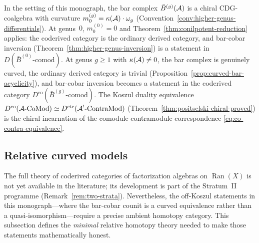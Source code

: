 \begin{remark}
\label{rem:coderived-bar-cobar}
In the setting of this monograph, the bar complex
$\bar{B}^{(g)}(\mathcal{A})$ is a chiral CDG-coalgebra with curvature
$m_0^{(g)} = \kappa(\mathcal{A}) \cdot \omega_g$
(Convention~\ref{conv:higher-genus-differentials}).
At genus~$0$, $m_0^{(0)} = 0$ and
Theorem~\ref{thm:conilpotent-reduction} applies: the coderived
category is the ordinary derived category, and bar-cobar
inversion (Theorem~\ref{thm:higher-genus-inversion})
is a statement in $D(\bar{B}^{(0)}\text{-}\mathrm{comod})$.
At genus $g \geq 1$ with $\kappa(\mathcal{A}) \neq 0$, the bar complex
is genuinely curved, the ordinary derived category is trivial
(Proposition~\ref{prop:curved-bar-acyclicity}), and bar-cobar
inversion becomes a statement in the coderived category
$D^{\mathrm{co}}(\bar{B}^{(g)}\text{-}\mathrm{comod})$.
The Koszul duality equivalence
$D^{\mathrm{co}}(\mathcal{A}\text{-}\mathrm{CoMod})
\simeq D^{\mathrm{ctr}}(\mathcal{A}^!\text{-}\mathrm{ContraMod})$
(Theorem~\ref{thm:positselski-chiral-proved}) is the chiral
incarnation of the comodule-contramodule correspondence
\eqref{eq:co-contra-equivalence}.
\end{remark}


\subsection{Relative curved models}
\label{sec:coderived-models}

The full theory of coderived categories of factorization algebras
on $\operatorname{Ran}(X)$ is not yet available in the literature;
its development is part of the Stratum~II programme
(Remark~\ref{rem:two-strata}).  Nevertheless, the off-Koszul
statements in this monograph---where the bar-cobar counit is
a curved equivalence rather than a quasi-isomorphism---require
a precise ambient homotopy category.  This subsection defines the
\emph{minimal} relative homotopy theory needed to make those
statements mathematically honest.

